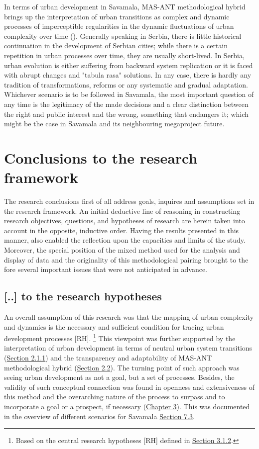 \documentclass[11pt]{report}
\begin{document}
{In terms of urban development in Savamala, MAS-ANT methodological hybrid brings up the interpretation of urban transitions as complex and dynamic processes of imperceptible regularities in the dynamic fluctuations of urban complexity over time (\href{Lee}{\citealt{lee_fernand_2012}}).
Generally speaking in Serbia, there is little historical continuation in the development of Serbian cities; while there is a certain repetition in urban processes over time, they are usually short-lived.
In Serbia, urban evolution is either suffering from backward system replication or it is faced with abrupt changes and "tabula rasa" solutions. In any case, there is hardly any tradition of transformations, reforms or any systematic and gradual adaptation.
Whichever scenario is to be followed in Savamala, the most important question of any time is the legitimacy of the made decisions and a clear distinction between the right and public interest and the wrong, something that endangers it; which might be the case in Savamala and its neighbouring megaproject future.

\section{Conclusions to the research framework}

The research conclusions first of all address goals, inquires and assumptions set in the research framework.
An initial deductive line of reasoning in constructing research objectives, questions, and hypotheses of research are herein taken into account in the opposite, inductive order.
Having the results presented in this manner, also enabled the reflection upon the capacities and limits of the study.
Moreover, the special position of the mixed method used for the analysis and display of data and the originality of this methodological pairing brought to the fore several important issues that were not anticipated in advance.

\subsection{[..] to the research hypotheses}

An overall assumption of this research was that the mapping of urban complexity and dynamics is the necessary and sufficient condition for tracing urban development processes [RH].
\footnote{Based on the central research hypotheses [RH] defined in \href{Section 3.1.2}{Section 3.1.2}.}
This viewpoint was further supported by the interpretation of urban development in terms of neutral urban system transitions (\href{Section 2.1.1}{Section 2.1.1}) and the transparency and adaptability of MAS-ANT methodological hybrid (\href{Section 2.2}{Section 2.2}).
The turning point of such approach was seeing urban development as not a goal, but a set of processes.
Besides, the validity of such conceptual connection was found in openness and extensiveness of this method and the overarching nature of the process to surpass and to incorporate a goal or a prospect, if necessary (\href{Chapter 3}{Chapter 3}).
This was documented in the overview of different scenarios for Savamala \href{Section 7.3}{Section 7.3}.
\\

}
\end{document}

